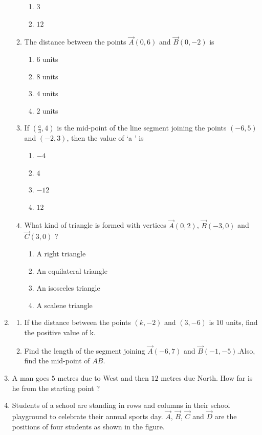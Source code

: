 \begin{enumerate}[label=\thesection.\arabic*.,ref=\thesection.\theenumi]
\begin{enumerate}[label=(\roman*)]
\begin{enumerate}[label=(\Alph*)]
				     \item $3$
				     \item $12$
			     \end{enumerate}
		    \item The distance between the points $\vec{A}(0, 6)$ and $\vec{B}(0, -2)$ is 
			    \begin{enumerate}[label=(\Alph*)]
				    \item $6$ units
				    \item $8$ units
				    \item $4$ units
				    \item $2$ units
				    \end{enumerate}
		    \item If $(\frac{a}{3},4)$ is the mid-point of the line segment joining the points $(-6, 5)$ and $(-2, 3)$, then the value of \lq a \rq{} is
		    \begin{enumerate}[label=(\Alph*)]
				    \item $-4$
				    \item $4$
				    \item $-12$
				    \item $12$
			    \end{enumerate}
		    \item What kind of triangle is formed with vertices $\vec{A}(0, 2)$, $\vec{B}(-3, 0)$ and $\vec{C}(3, 0)$ ?
			    \begin{enumerate}[label=(\Alph*)]
				    \item A right triangle
				    \item An equilateral triangle
				    \item An isosceles triangle
				    \item A scalene triangle
			    \end{enumerate}
	     \end{enumerate}
     \item \begin{enumerate}[label=(\alph*)]
		     \item If the distance between the points $(k, -2)$ and $(3, -6)$ is $10$ units, find the positive value of k.
		     \item Find the length of the segment joining $\vec{A}(-6, 7)$ and $\vec{B}(-1, -5)$.Also, find the mid-point of $AB$. 
     \end{enumerate}
     \item A man goes $5$ metres due to West and then $12$ metres due North. How far is he from the starting point ?
     \item Students of a school are standing in rows and columns in their school playground to celebrate their annual sports day. $\vec{A}$, $\vec{B}$, $\vec{C}$ and $\vec{D}$ are the positions of four students as shown in the figure. \\

\end{enumerate}
